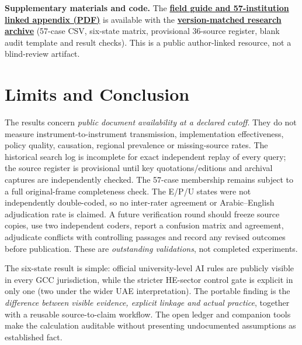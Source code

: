 \documentclass[conference,letterpaper]{IEEEtran}
\newif\ifblind
\begin{document}
\ifblind
\noindent\textbf{Supplementary materials.} An anonymous companion PDF presents the 57-institution evidence/search key, plus a practical source-coding and bilingual search template. For review-stage anonymity, repository ownership information is omitted here; author-identifying archival links will be added only if permitted by the venue.
\else
\noindent\textbf{Supplementary materials and code.} The \href{https://github.com/shaikhamalkawi-ux/From-AI-Strategy-to-University-Rules-in-the-GCC/blob/main/ICAMAC2026_Paper90_R4_57/supplement/ICAMAC_Paper90_R4_FieldGuide_and_57_Appendix.pdf}{\textbf{field guide and 57-institution linked appendix (PDF)}} is available with the \href{https://github.com/shaikhamalkawi-ux/From-AI-Strategy-to-University-Rules-in-the-GCC/tree/main/ICAMAC2026_Paper90_R4_57}{\textbf{version-matched research archive}} (57-case CSV, six-state matrix, provisional 36-source register, blank audit template and result checks). This is a public author-linked resource, not a blind-review artifact.
\fi

\section{Limits and Conclusion}
The results concern \emph{public document availability at a declared cutoff}. They do not measure instrument-to-instrument transmission, implementation effectiveness, policy quality, causation, regional prevalence or missing-source rates. The historical search log is incomplete for exact independent replay of every query; the source register is provisional until key quotations/editions and archival captures are independently checked. The 57-case membership remains subject to a full original-frame completeness check. The E/P/U states were not independently double-coded, so no inter-rater agreement or Arabic--English adjudication rate is claimed. A future verification round should freeze source copies, use two independent coders, report a confusion matrix and agreement, adjudicate conflicts with controlling passages and record any revised outcomes before publication. These are \emph{outstanding validations}, not completed experiments.

The six-state result is simple: official university-level AI rules are publicly visible in every GCC jurisdiction, while the stricter HE-sector control gate is explicit in only one (two under the wider UAE interpretation). The portable finding is the \emph{difference between visible evidence, explicit linkage and actual practice}, together with a reusable source-to-claim workflow. The open ledger and companion tools make the calculation auditable without presenting undocumented assumptions as established fact.
\end{document}
